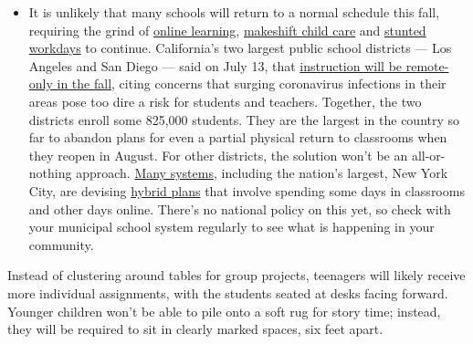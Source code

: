 \begin{itemize}
  \begin{itemize}
  \tightlist
  \item
    It is unlikely that many schools will return to a normal schedule
    this fall, requiring the grind of
    \href{https://www.nytimes.com/2020/06/05/us/coronavirus-education-lost-learning.html?action=click\&pgtype=Article\&state=default\&region=MAIN_CONTENT_3\&context=storylines_faq}{online
    learning},
    \href{https://www.nytimes.com/2020/05/29/us/coronavirus-child-care-centers.html?action=click\&pgtype=Article\&state=default\&region=MAIN_CONTENT_3\&context=storylines_faq}{makeshift
    child care} and
    \href{https://www.nytimes.com/2020/06/03/business/economy/coronavirus-working-women.html?action=click\&pgtype=Article\&state=default\&region=MAIN_CONTENT_3\&context=storylines_faq}{stunted
    workdays} to continue. California's two largest public school
    districts --- Los Angeles and San Diego --- said on July 13, that
    \href{https://www.nytimes.com/2020/07/13/us/lausd-san-diego-school-reopening.html?action=click\&pgtype=Article\&state=default\&region=MAIN_CONTENT_3\&context=storylines_faq}{instruction
    will be remote-only in the fall}, citing concerns that surging
    coronavirus infections in their areas pose too dire a risk for
    students and teachers. Together, the two districts enroll some
    825,000 students. They are the largest in the country so far to
    abandon plans for even a partial physical return to classrooms when
    they reopen in August. For other districts, the solution won't be an
    all-or-nothing approach.
    \href{https://bioethics.jhu.edu/research-and-outreach/projects/eschool-initiative/school-policy-tracker/}{Many
    systems}, including the nation's largest, New York City, are
    devising
    \href{https://www.nytimes.com/2020/06/26/us/coronavirus-schools-reopen-fall.html?action=click\&pgtype=Article\&state=default\&region=MAIN_CONTENT_3\&context=storylines_faq}{hybrid
    plans} that involve spending some days in classrooms and other days
    online. There's no national policy on this yet, so check with your
    municipal school system regularly to see what is happening in your
    community.
  \end{itemize}
\end{itemize}

Instead of clustering around tables for group projects, teenagers will
likely receive more individual assignments, with the students seated at
desks facing forward. Younger children won't be able to pile onto a soft
rug for story time; instead, they will be required to sit in clearly
marked spaces, six feet apart.

